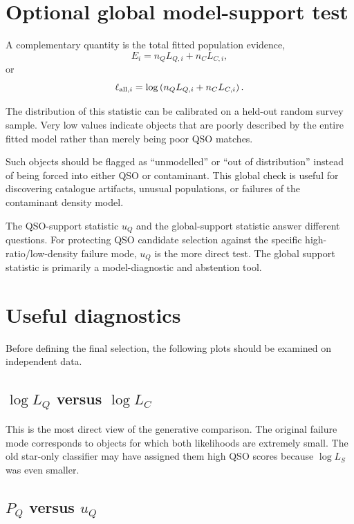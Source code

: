 \documentclass[11pt]{article}
\begin{document}
\section{Optional global model-support test}

A complementary quantity is the total fitted population evidence,
%
\begin{equation}
E_i
=
n_Q L_{Q,i}+n_C L_{C,i},
\end{equation}
%
or
%
\begin{equation}
\ell_{{\rm all},i}
=
\log\left(n_Q L_{Q,i}+n_C L_{C,i}\right).
\end{equation}

The distribution of this statistic can be calibrated on a held-out random
survey sample. Very low values indicate objects that are poorly described by
the entire fitted model rather than merely being poor QSO matches.

Such objects should be flagged as ``unmodelled'' or ``out of distribution''
instead of being forced into either QSO or contaminant. This global check is
useful for discovering catalogue artifacts, unusual populations, or failures
of the contaminant density model.

The QSO-support statistic $u_Q$ and the global-support statistic answer
different questions. For protecting QSO candidate selection against the
specific high-ratio/low-density failure mode, $u_Q$ is the more direct test.
The global support statistic is primarily a model-diagnostic and
abstention tool.

\section{Useful diagnostics}

Before defining the final selection, the following plots should be examined
on independent data.

\subsection{$\log L_Q$ versus $\log L_C$}

This is the most direct view of the generative comparison. The original
failure mode corresponds to objects for which both likelihoods are extremely
small. The old star-only classifier may have assigned them high QSO scores
because $\log L_S$ was even smaller.

\subsection{$P_Q$ versus $u_Q$}
\end{document}
